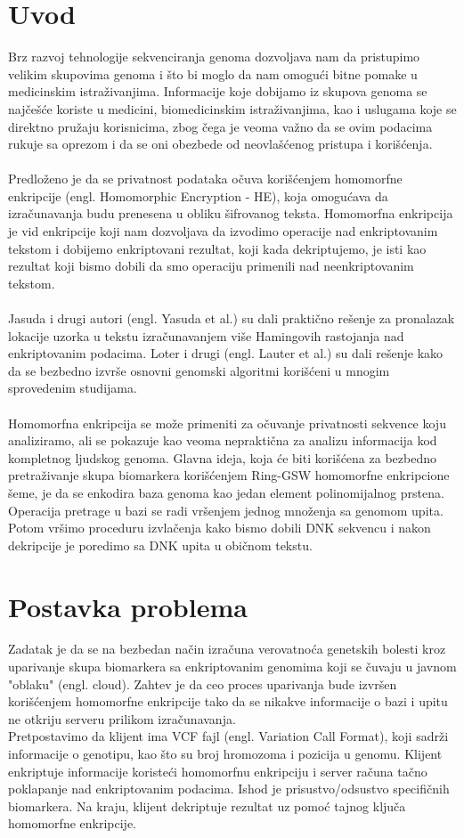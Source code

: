 \documentclass[a4paper]{article}
\begin{document}
\section{Uvod}
\label{sec:uvod}
Brz razvoj tehnologije sekvenciranja genoma dozvoljava nam da pristupimo velikim skupovima genoma i što bi moglo da nam omogući bitne pomake u medicinskim istraživanjima. Informacije koje dobijamo iz skupova genoma se najčešće koriste u medicini, biomedicinskim istraživanjima, kao i uslugama koje se direktno pružaju korisnicima, zbog čega je veoma važno da se ovim podacima rukuje sa oprezom i da se oni obezbede od neovlašćenog pristupa i korišćenja.\\\\
Predloženo je da se privatnost podataka očuva korišćenjem homomorfne enkripcije (engl. Homomorphic Encryption - HE), koja omogućava da izračunavanja budu prenesena u obliku šifrovanog teksta.
Homomorfna enkripcija je vid enkripcije koji nam dozvoljava da izvodimo operacije nad enkriptovanim tekstom i dobijemo enkriptovani rezultat, koji kada dekriptujemo, je isti kao rezultat koji bismo dobili da smo operaciju primenili nad neenkriptovanim tekstom.\\\\ Jasuda i drugi autori (engl. Yasuda et al.) su dali praktično rešenje za pronalazak lokacije uzorka u tekstu izračunavanjem više Hamingovih rastojanja nad enkriptovanim podacima. Loter i drugi (engl. Lauter et al.) su dali rešenje kako da se bezbedno izvrše osnovni genomski algoritmi korišćeni u mnogim sprovedenim studijama.\\\\
Homomorfna enkripcija se može primeniti za očuvanje privatnosti sekvence koju analiziramo, ali se pokazuje kao veoma nepraktična za analizu informacija kod kompletnog ljudskog genoma.
Glavna ideja, koja će biti korišćena za bezbedno pretraživanje skupa biomarkera korišćenjem Ring-GSW homomorfne enkripcione šeme, je da se enkodira baza genoma kao jedan element polinomijalnog prstena. Operacija pretrage u bazi se radi vršenjem jednog množenja sa genomom upita. Potom vršimo proceduru izvlačenja kako bismo dobili DNK sekvencu i nakon dekripcije je poredimo sa DNK upita u običnom tekstu. 

\section{Postavka problema}
Zadatak je da se na bezbedan način izračuna verovatnoća genetskih bolesti kroz uparivanje skupa biomarkera sa enkriptovanim genomima koji se čuvaju u javnom "oblaku" (engl. cloud). Zahtev je da ceo proces uparivanja bude izvršen korišćenjem homomorfne enkripcije tako da se nikakve informacije o bazi i upitu ne otkriju serveru prilikom izračunavanja.\\
Pretpostavimo da klijent ima VCF fajl (engl. Variation Call Format), koji sadrži informacije o genotipu, kao što su broj hromozoma i pozicija u genomu. Klijent enkriptuje informacije koristeći homomorfnu enkripciju i server računa tačno poklapanje nad enkriptovanim podacima. Ishod je prisustvo/odsustvo specifičnih biomarkera. Na kraju, klijent dekriptuje rezultat uz pomoć tajnog ključa homomorfne enkripcije.
\end{document}
